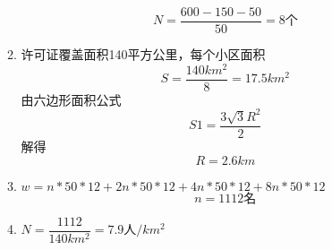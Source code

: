 \documentclass{article}
\begin{document}
\begin{enumerate}
\begin{enumerate}
\begin{equation}
                N=\frac{600-150-50}{50}=8\text{个}
              \end{equation} 
        \item 许可证覆盖面积140平方公里，每个小区面积
              \begin{equation}
                S=\frac{140km^2}{8}=17.5km^2
              \end{equation}      
              由六边形面积公式
              \begin{equation}
                S1=\frac{3\sqrt{3}R^2}{2}
              \end{equation}
              解得
              \begin{equation}
                R=2.6km
              \end{equation}
        \item $w=n*50*12+2n*50*12+4n*50*12+8n*50*12$
              \begin{equation}
                n=1112\text{名}
              \end{equation}
        \item $N=\dfrac{1112}{140km^2}=7.9\text{人}/km^2$
    \end{enumerate}
\end{enumerate}
\end{document}
